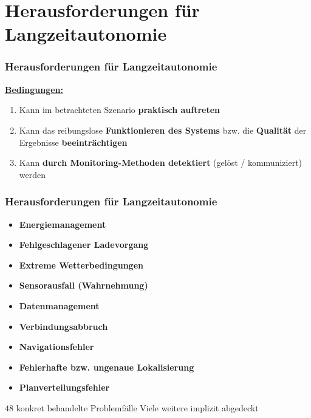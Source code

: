 \documentclass{beamer}
\begin{document}
\section{Herausforderungen für Langzeitautonomie}

\begin{frame}
  \frametitle{Herausforderungen für Langzeitautonomie}
  \textbf{\underline{Bedingungen:}}
  \begin{enumerate}
    \item Kann im betrachteten Szenario \textbf{praktisch auftreten}
    \item Kann das reibungslose \textbf{Funktionieren des Systems} bzw. die \textbf{Qualität} der Ergebnisse \textbf{beeinträchtigen}
    \item Kann \textbf{durch Monitoring-Methoden detektiert} (gelöst / kommuniziert) werden
  \end{enumerate}
\end{frame}

\begin{frame}
  \frametitle{Herausforderungen für Langzeitautonomie}
  \begin{itemize}
    \item \textbf{Energiemanagement}
    \item \textbf{Fehlgeschlagener Ladevorgang}
    \item \textbf{Extreme Wetterbedingungen}
    \item \textbf{Sensorausfall (Wahrnehmung)}
    \item \textbf{Datenmanagement}
    \item \textbf{Verbindungsabbruch}
    \item \textbf{Navigationsfehler}
    \item \textbf{Fehlerhafte bzw. ungenaue Lokalisierung}
    \item \textbf{Planverteilungsfehler}
  \end{itemize}
  \textrightarrow \thinspace $48$ konkret behandelte Problemfälle\newline
  \textrightarrow \thinspace Viele weitere implizit abgedeckt
\end{frame}
\end{document}
